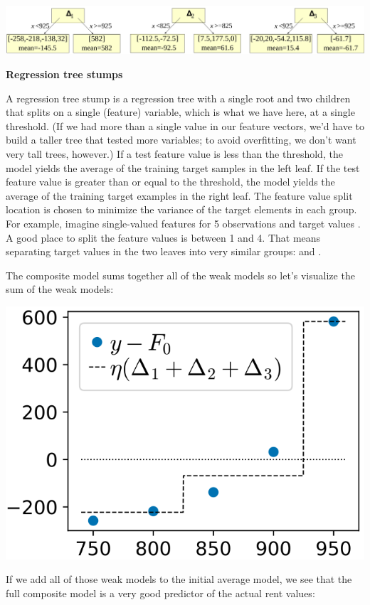 \documentclass[]{book}
\theoremstyle{definition}
\theoremstyle{definition}
\theoremstyle{definition}
\theoremstyle{remark}
\begin{document}
\includegraphics[width=1\linewidth]{figures/stubs-mse}

\textbf{Regression tree stumps}

A regression tree stump is a regression tree with a single root and two
children that splits on a single (feature) variable, which is what we
have here, at a single threshold. (If we had more than a single value in
our feature vectors, we'd have to build a taller tree that tested more
variables; to avoid overfitting, we don't want very tall trees,
however.) If a test feature value is less than the threshold, the model
yields the average of the training target samples in the left leaf. If
the test feature value is greater than or equal to the threshold, the
model yields the average of the training target examples in the right
leaf. The feature value split location is chosen to minimize the
variance of the target elements in each group. For example, imagine
single-valued features for 5 observations and target values . A good
place to split the feature values is between 1 and 4. That means
separating target values in the two leaves into very similar groups: and
.

The composite model sums together all of the weak models so let's
visualize the sum of the weak models:

\includegraphics{figures/L2-loss_examples_5.svg}

If we add all of those weak models to the initial average model, we see
that the full composite model is a very good predictor of the actual
rent values:
\end{document}
